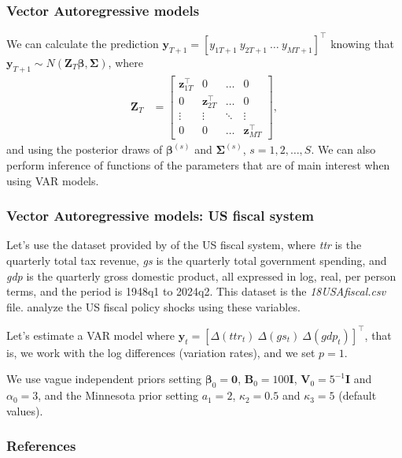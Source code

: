 \documentclass[12pt, compress]{beamer}
\begin{document}
\begin{frame}
	\frametitle{Vector Autoregressive models}
We can calculate the prediction $\bm{y}_{T+1}=[y_{1T+1} \ y_{2T+1} \ \dots \ y_{MT+1}]^{\top}$ knowing that $\bm{y}_{T+1}\sim N(\bm{Z}_{T}\bm{\beta},\bm{\Sigma})$, where \begin{align*}
	\bm{Z}_T&=\begin{bmatrix}
		\bm{z}_{1T}^{\top} & 0 & \dots & 0\\
		0 & \bm{z}_{2T}^{\top} & \dots & 0\\
		\vdots & \vdots & \ddots & \vdots\\
		0 & 0& \dots & \bm{z}_{MT}^{\top}		
	\end{bmatrix},
\end{align*} 
and using the posterior draws of $\bm{\beta}^{(s)}$ and $\bm{\Sigma}^{(s)}$, $s=1,2,\dots,S$. We can also perform inference of functions of the parameters that are of main interest when using VAR models.
\end{frame}

\begin{frame}
	\frametitle{Vector Autoregressive models: US fiscal system}
Let's use the dataset provided by \cite{Tomasz2024} of the US fiscal system, where \textit{ttr} is the quarterly total tax revenue, \textit{gs} is the quarterly total government spending, and \textit{gdp} is the quarterly gross domestic product, all expressed in log, real, per person terms, and the period is 1948q1 to 2024q2. This dataset is the \textit{18USAfiscal.csv} file. \cite{mertens2014reconciliation} analyze the US fiscal policy shocks using these variables.

Let's estimate a VAR model where $\bm{y}_t=[\Delta(ttr_t) \ \Delta(gs_t) \ \Delta(gdp_t)]^{\top}$, that is, we work with the log differences (variation rates), and we set $p=1$.

We use vague independent priors setting $\bm{\beta}_0=\bm{0}$, $\bm{B}_0=100\bm{I}$, $\bm{V}_0=5^{-1}\bm{I}$ and $\alpha_0=3$, and the Minnesota prior setting $a_1=2$, $\kappa_2=0.5$ and $\kappa_3=5$ (default values).
\end{frame}



\begin{frame}[allowframebreaks]
	\frametitle{References}
		{\footnotesize
		
		}
\end{frame}
	
\end{document}
